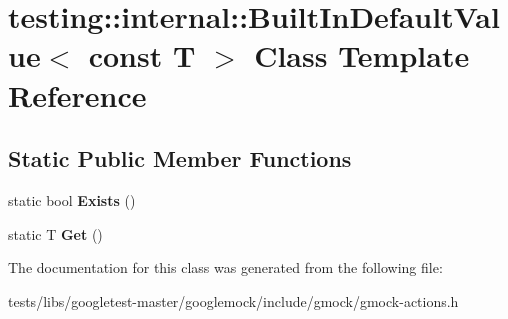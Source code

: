 \hypertarget{classtesting_1_1internal_1_1BuiltInDefaultValue_3_01const_01T_01_4}{}\section{testing\+:\+:internal\+:\+:Built\+In\+Default\+Value$<$ const T $>$ Class Template Reference}
\label{classtesting_1_1internal_1_1BuiltInDefaultValue_3_01const_01T_01_4}
\subsection*{Static Public Member Functions}
\begin{DoxyCompactItemize}
\item 
\mbox{\label{classtesting_1_1internal_1_1BuiltInDefaultValue_3_01const_01T_01_4_a1814803ec5dcc660ee1f1092a96b79fa}} 
static bool {\bfseries Exists} ()
\item 
\mbox{\label{classtesting_1_1internal_1_1BuiltInDefaultValue_3_01const_01T_01_4_a5996754952ecbcc5da77a2cebd4722de}} 
static T {\bfseries Get} ()
\end{DoxyCompactItemize}


The documentation for this class was generated from the following file\+:\begin{DoxyCompactItemize}
\item 
tests/libs/googletest-\/master/googlemock/include/gmock/gmock-\/actions.\+h\end{DoxyCompactItemize}
